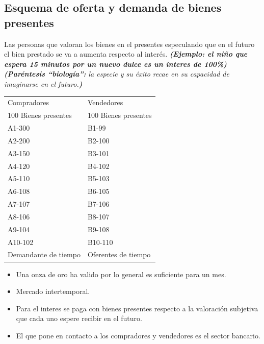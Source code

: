 \subsection{Esquema de oferta y demanda de bienes presentes}
Las personas que valoran los bienes en el presentes especulando que en el futuro el bien prestado se va a aumenta respecto al interés.
\newline 
\textbf{\emph{(Ejemplo: el niño que espera 15 minutos por un nuevo dulce es un interes de 100\%)}} \emph{\textbf{(Paréntesis ``biología'':} la especie y su éxito recae en su capacidad de imaginarse en el futuro.\textbf{)}}
\begin{center}
\begin{tabular}{ | p{5cm} | p{5cm} | }
 \hline
  Compradores & Vendedores      \\
  100 Bienes presentes & 100 Bienes presentes \\ 
 \hline
    A1-300 & B1-99 \\ 
    A2-200 & B2-100 \\ 
    A3-150 & B3-101 \\ 
    A4-120 & B4-102 \\ 
    A5-110 & B5-103 \\ 
    A6-108 & B6-105 \\ 
    A7-107 & B7-106 \\ 
    A8-106 & B8-107 \\ 
    A9-104 & B9-108 \\ 
    A10-102 & B10-110 \\ 
\hline
    Demandante de tiempo & Oferentes de tiempo \\ 
\hline
\end{tabular}
\end{center}

\begin{itemize}
    \item Una onza de oro ha valido por lo general es suficiente para un mes.
    \item Mercado intertemporal.
    \item Para el interes se paga con bienes presentes respecto a la valoración subjetiva que cada uno espere recibir en el futuro.
    \item El que pone en contacto a los compradores y vendedores es el sector bancario.
\end{itemize}

